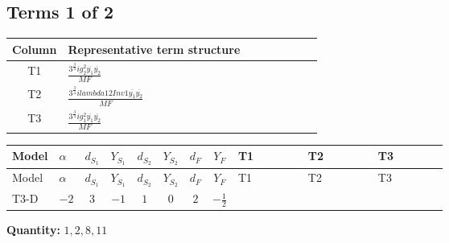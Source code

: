 \documentclass[8pt]{article}
\begin{document}
\begin{landscape}
\subsection*{Terms 1 of 2}
\begin{center}
\begin{tabular}{@{}c >{\raggedright\arraybackslash}p{0.82\linewidth}@{}}
\toprule
Column & Representative term structure \\
\midrule
T1 & \(\displaystyle \frac{3^{\frac{3}{4}} i g_{2}^{2} \overline{y_{1}} \overline{y_{2}}}{MF}\) \\
\midrule
T2 & \(\displaystyle \frac{3^{\frac{3}{4}} i lambda12Inv1 \overline{y_{1}} \overline{y_{2}}}{MF}\) \\
\midrule
T3 & \(\displaystyle \frac{3^{\frac{3}{4}} i g_{1}^{2} \overline{y_{1}} \overline{y_{2}}}{MF}\) \\
\midrule
\bottomrule
\end{tabular}
\end{center}
\smallskip
\tiny
\begin{longtable}{@{}llcccccc >{\raggedright\arraybackslash}p{0.21\linewidth} >{\raggedright\arraybackslash}p{0.21\linewidth} >{\raggedright\arraybackslash}p{0.21\linewidth}@{}}
\toprule
Model & $\alpha$ & $d_{S_1}$ & $Y_{S_1}$ & $d_{S_2}$ & $Y_{S_2}$ & $d_F$ & $Y_F$ & T1 & T2 & T3 \\
\midrule
\endfirsthead
\toprule
Model & $\alpha$ & $d_{S_1}$ & $Y_{S_1}$ & $d_{S_2}$ & $Y_{S_2}$ & $d_F$ & $Y_F$ & T1 & T2 & T3 \\
\midrule
\endhead
T3-D & $-2$ & $3$ & $-1$ & $1$ & $0$ & $2$ & $-\frac{1}{2}$ & \scriptsize\adjustbox{max width=\linewidth}{$\begin{gathered} - \frac{25 \cdot 3^{\frac{3}{4}} i g_{2}^{2} \overline{y_{1}} \overline{y_{2}}}{24 MF}\end{gathered}$} & \scriptsize\adjustbox{max width=\linewidth}{$\begin{gathered} - \frac{3^{\frac{3}{4}} i lambda12Inv1 \overline{y_{1}} \overline{y_{2}}}{6 MF}\end{gathered}$} & \scriptsize\adjustbox{max width=\linewidth}{$\begin{gathered} - \frac{3^{\frac{3}{4}} i g_{1}^{2} \overline{y_{1}} \overline{y_{2}}}{8 MF}\end{gathered}$} \\
\midrule
\bottomrule
\end{longtable}
\clearpage
\noindent\textbf{Quantity: }$\mathrm{1,2,8,11}$\par\smallskip

\end{landscape}
\end{document}

